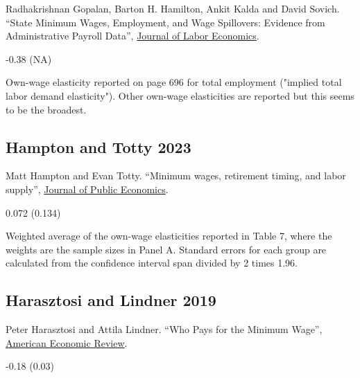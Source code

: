 \noindent Radhakrishnan Gopalan, Barton H. Hamilton, Ankit Kalda and David Sovich. ``State Minimum Wages, Employment, and Wage Spillovers: Evidence from Administrative Payroll Data'', \href{https://doi.org/10.1086/711355}{Journal of Labor Economics}.

\vspace{0.7em}

 -0.38 (NA)

\vspace{0.7em}

 Own-wage elasticity reported on page 696 for total employment ("implied total labor demand elasticity"). Other own-wage elasticities are reported but this seems to be the broadest.

\subsection*{Hampton and Totty 2023}
\vspace{-0.7em}

\noindent Matt Hampton and Evan Totty. ``Minimum wages, retirement timing, and labor supply'', \href{https://doi.org/10.1016/j.jpubeco.2023.104924}{Journal of Public Economics}.

\vspace{0.7em}

 0.072 (0.134)

\vspace{0.7em}

 Weighted average of the own-wage elasticities reported in Table 7, where the weights are the sample sizes in Panel A. Standard errors for each group are calculated from the confidence interval span divided by 2 times 1.96.

\subsection*{Harasztosi and Lindner 2019}
\vspace{-0.7em}

\noindent Peter Harasztosi and Attila Lindner. ``Who Pays for the Minimum Wage'', \href{https://doi.org/10.1257/aer.20171445}{American Economic Review}.

\vspace{0.7em}

 -0.18 (0.03)

